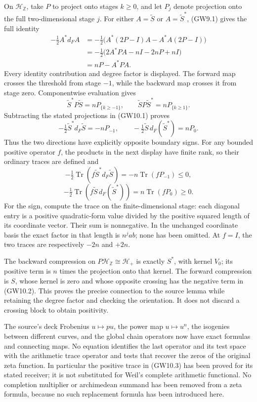 On \(\mathcal H_{\mathbb Z}\), take \(P\) to project onto stages
\(k\ge0\), and let \(P_j\) denote projection onto the full
two-dimensional stage \(j\). For either \(A=\widetilde S\) or
\(A=\widetilde S^*\), (GW9.1) gives the full identity \[
\begin{aligned}
-\tfrac12 A^*d_FA
&=-\tfrac12\bigl(A^*(2P-I)A-A^*A(2P-I)\bigr)\\
&=-\tfrac12\bigl(2A^*PA-nI-2nP+nI\bigr)\\
&=nP-A^*PA.
\end{aligned}
\tag{GW10.1}
\] Every identity contribution and degree factor is displayed. The
forward map crosses the threshold from stage \(-1\), while the backward
map crosses it from stage zero. Componentwise evaluation gives \[
\widetilde S^*P\widetilde S=nP_{\{k\ge-1\}},
\qquad
\widetilde SP\widetilde S^*=nP_{\{k\ge1\}}.
\] Subtracting the stated projections in (GW10.1) proves \[
-\tfrac12\widetilde S^*d_F\widetilde S=-nP_{-1},
\qquad
-\tfrac12\widetilde S\,d_F(\widetilde S^*)=nP_0.
\tag{GW10.2}
\] Thus the two directions have explicitly opposite boundary signs. For
any bounded positive operator \(f\), the products in the next display
have finite rank, so their ordinary traces are defined and \[
-\tfrac12\operatorname{Tr}(f\widetilde S^*d_F\widetilde S)
=-n\operatorname{Tr}(fP_{-1})\le0,
\] \[
-\tfrac12\operatorname{Tr}(f\widetilde S\,d_F(\widetilde S^*))
=n\operatorname{Tr}(fP_0)\ge0.
\tag{GW10.3}
\] For the sign, compute the trace on the finite-dimensional stage: each
diagonal entry is a positive quadratic-form value divided by the
positive squared length of its coordinate vector. Their sum is
nonnegative. In the unchanged coordinate basis the exact factor in that
length is \(n^jab\); none has been omitted. At \(f=I\), the two traces
are respectively \(-2n\) and \(+2n\).

The backward compression on \(P\mathcal H_{\mathbb Z}\cong\mathcal H_+\)
is exactly \(S^*\), with kernel \(V_0\); its positive term is \(n\)
times the projection onto that kernel. The forward compression is \(S\),
whose kernel is zero and whose opposite crossing has the negative term
in (GW10.2). This proves the precise connection to the source lemma
while retaining the degree factor and checking the orientation. It does
not discard a crossing block to obtain positivity.

The source's deck Frobenius \(u\mapsto pu\), the power map
\(u\mapsto u^n\), the isogenies between different curves, and the global
chain operators now have exact formulas and connecting maps. No equation
identifies the last operator and its test space with the arithmetic
trace operator and tests that recover the zeros of the original zeta
function. In particular the positive trace in (GW10.3) has been proved
for its stated receiver; it is not substituted for Weil's complete
arithmetic functional. No completion multiplier or archimedean summand
has been removed from a zeta formula, because no such replacement
formula has been introduced here.

